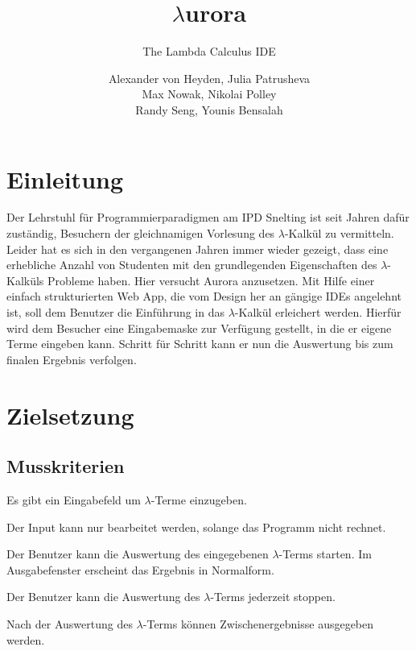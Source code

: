 \documentclass[parskip=full,11pt,twoside]{scrartcl}
\title{\textbf{$\lambda$}urora}
\subtitle{The Lambda Calculus IDE}
\author{Alexander von Heyden, Julia Patrusheva\\
 Max Nowak, Nikolai Polley\\
 Randy Seng, Younis Bensalah}
\begin{document}
\maketitle
\newpage
\tableofcontents

\newpage
\section{Einleitung}
Der Lehrstuhl für Programmierparadigmen am IPD Snelting ist seit Jahren dafür zuständig, Besuchern der gleichnamigen Vorlesung des $\lambda$-Kalkül zu vermitteln. Leider hat es sich in den vergangenen Jahren immer wieder gezeigt, dass eine erhebliche Anzahl von Studenten mit den grundlegenden Eigenschaften des $\lambda$-Kalküls Probleme haben. Hier versucht Aurora anzusetzen. Mit Hilfe einer einfach strukturierten Web App, die vom Design her an gängige IDEs angelehnt ist, soll dem Benutzer die Einführung in das $\lambda$-Kalkül erleichert werden. Hierfür wird dem Besucher eine Eingabemaske zur Verfügung gestellt, in die er eigene Terme eingeben kann. Schritt für Schritt kann er nun die Auswertung bis zum finalen Ergebnis verfolgen.


\newpage
\section{Zielsetzung}


\subsection{Musskriterien}

Es gibt ein Eingabefeld um $\lambda$-Terme einzugeben.

Der Input kann nur bearbeitet werden, solange das Programm nicht rechnet.

Der Benutzer kann die Auswertung des eingegebenen $\lambda$-Terms starten. Im Ausgabefenster erscheint das Ergebnis in Normalform.

Der Benutzer kann die Auswertung des $\lambda$-Terms jederzeit stoppen.

Nach der Auswertung des $\lambda$-Terms können Zwischenergebnisse ausgegeben werden.
\end{document}
